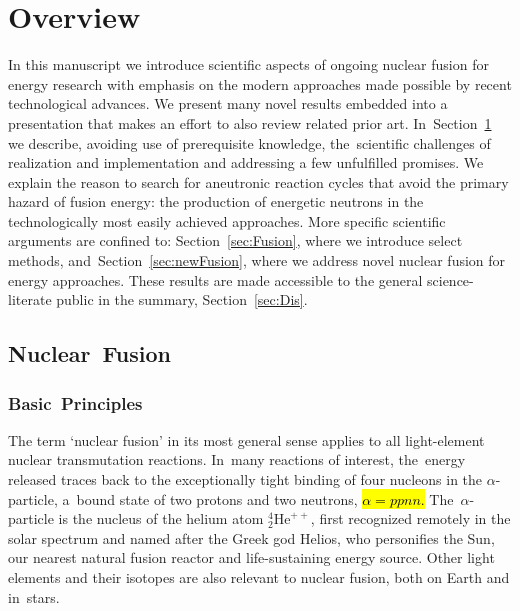 \documentclass[particles,article,accept,pdftex,moreauthors]{Definitions/mdpi}
\begin{document}
\tableofcontents
\section{Overview}\label{sec:overview}
In this manuscript we introduce scientific aspects of ongoing nuclear fusion for energy research with emphasis on the modern approaches made possible by recent technological advances. We present many novel results embedded into a presentation that makes an effort to also review related prior art. In~Section~\ref{sec:overview} we describe, avoiding use of prerequisite knowledge, the~scientific challenges of realization and implementation and addressing a few unfulfilled promises. We explain the reason to search for aneutronic reaction cycles that avoid the primary hazard of fusion energy: the production of energetic neutrons in the technologically most easily achieved approaches. More specific scientific arguments are confined to: Section~\ref{sec:Fusion}, where we introduce select methods, and~Section~\ref{sec:newFusion}, where we address novel nuclear fusion for energy approaches. These results are made accessible to the general science-literate public in the summary, Section~\ref{sec:Dis}.
\subsection{Nuclear~Fusion}\label{ssec:fusion}


\subsubsection{Basic~Principles}\label{sssec:basics}
The term `nuclear fusion' in its most general sense applies to all light-element nuclear transmutation reactions. In~many reactions of interest, the~energy released traces back to the exceptionally tight binding of four nucleons in the $\alpha$-particle, a~bound state of two protons and two neutrons, \hl{$\alpha=ppnn$.} %
 The~$\alpha$-particle is the nucleus of the helium atom ${}^{4\!}_{2\!}\mathrm{He}^{++}$, first recognized remotely in the solar spectrum and named after the Greek god Helios, who personifies the Sun, our nearest natural fusion reactor and life-sustaining energy source. Other light elements and their isotopes are also relevant to nuclear fusion, both on Earth and in~stars.
\end{document}
